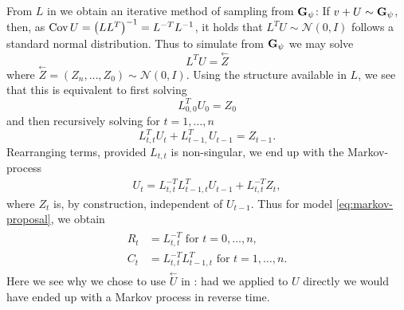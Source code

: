 From $L$ in  we obtain an iterative method of sampling from $\mathbf G_{\psi}$: If $v + U \sim \mathbf G_{\psi}$, then, as $\operatorname{Cov} U = \left( L L^{T} \right)^{-1} = L^{-T}L^{-1}$, it holds that $L^{T}U \sim \mathcal N(0, I)$ follows a standard normal distribution. Thus to simulate from $\mathbf G_{\psi}$ we may solve
$$
L^{T}U = \overset{\leftarrow} Z
$$
where $\overset{\leftarrow}Z = \left( Z_{n}, \dots, Z_{0} \right) \sim \mathcal N(0, I)$. Using the structure available in $L$, we see that this is equivalent to first solving
$$
L_{0,0}^T U_{0} = Z_{0}
$$
and then recursively solving for $t = 1, \dots, n$
$$
L_{t,t}^T U_{t} + L_{t-1, }^{T} U_{t-1} = Z_{t - 1}.
$$
Rearranging terms, provided $L_{t,t}$ is non-singular, we end up with the Markov-process
\begin{align}
\label{eq:rev_time_u}
    U_{t} = L^{-T}_{t,t} L_{t-1, t }^T U_{t - 1} +L^{-T}_{t,t} Z_{t},
\end{align}
where $Z_{t}$ is, by construction, independent of $U_{t - 1}$. Thus for model \eqref{eq:markov-proposal}, we obtain
\begin{align}
    \label{eq:parameters_markov_from_L}
    \begin{split}
    R_{t} &= L^{-T}_{t,t} \text{ for } t = 0, \dots, n,\\
    C_{t} &= L^{-T}_{t,t} L_{t-1, t }^T \text{ for } t =1, \dots, n.
    \end{split}
\end{align}
Here we see why we chose to use $\overset{\leftarrow}U$ in : had we applied  to $U$ directly we would have ended up with a Markov process in reverse time.

